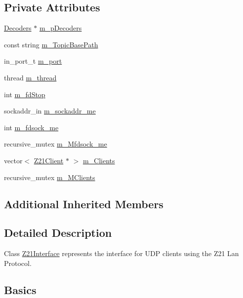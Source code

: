 \subsection*{Private Attributes}
\begin{DoxyCompactItemize}
\item 
\hyperlink{classIoTT_1_1Decoders}{Decoders} $\ast$ \hyperlink{classIoTT_1_1Z21Interface_ae978137ddd81489343ac8486d74d921a}{m\+\_\+p\+Decoders}
\item 
const string \hyperlink{classIoTT_1_1Z21Interface_a88d755ba0c08a8c5dc79357e9093e980}{m\+\_\+\+Topic\+Base\+Path}
\item 
in\+\_\+port\+\_\+t \hyperlink{classIoTT_1_1Z21Interface_a303f4581893ff5b9808fda50a428ef4c}{m\+\_\+port}
\item 
thread \hyperlink{classIoTT_1_1Z21Interface_ae87188b5116702638ac12db408cb8fa2}{m\+\_\+thread}
\item 
int \hyperlink{classIoTT_1_1Z21Interface_ad5136979b4f41f3fabdc2ee5818b0c71}{m\+\_\+fd\+Stop}
\item 
sockaddr\+\_\+in \hyperlink{classIoTT_1_1Z21Interface_adefd2315595c417c3ed51e2ccc06edbc}{m\+\_\+sockaddr\+\_\+me}
\item 
int \hyperlink{classIoTT_1_1Z21Interface_a644498b25a639cc18b7a0ba1d30e15e3}{m\+\_\+fdsock\+\_\+me}
\item 
recursive\+\_\+mutex \hyperlink{classIoTT_1_1Z21Interface_a1212b3351e13f38619bb11dc56f689cd}{m\+\_\+\+Mfdsock\+\_\+me}
\item 
vector$<$ \hyperlink{classIoTT_1_1Z21Client}{Z21\+Client} $\ast$ $>$ \hyperlink{classIoTT_1_1Z21Interface_a95d2a91c8058d1cf26c19cd8db9a2ca1}{m\+\_\+\+Clients}
\item 
recursive\+\_\+mutex \hyperlink{classIoTT_1_1Z21Interface_ac03305fbb3face4b0db005087d5fc426}{m\+\_\+\+M\+Clients}
\end{DoxyCompactItemize}
\subsection*{Additional Inherited Members}


\subsection{Detailed Description}
Class \hyperlink{classIoTT_1_1Z21Interface}{Z21\+Interface} represents the interface for U\+DP clients using the Z21 Lan Protocol.

\subsection*{Basics}

